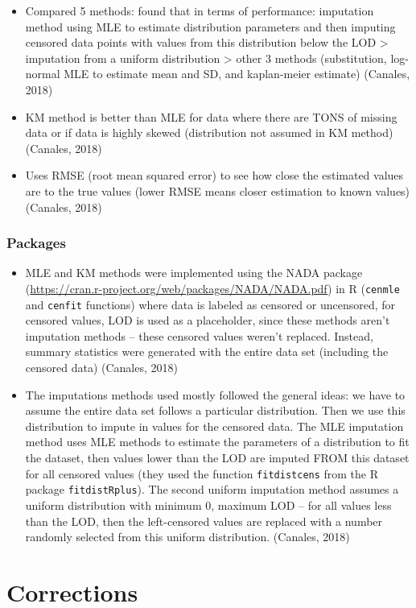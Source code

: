 \documentclass[12pt, twoside]{amherstthesis}
\begin{document}
\begin{itemize}
\item
  Compared 5 methods: found that in terms of performance: imputation method using MLE to estimate distribution parameters and then imputing censored data points with values from this distribution below the LOD \textgreater{} imputation from a uniform distribution \textgreater{} other 3 methods (substitution, log-normal MLE to estimate mean and SD, and kaplan-meier estimate) (Canales, 2018)
\item
  KM method is better than MLE for data where there are TONS of missing data or if data is highly skewed (distribution not assumed in KM method) (Canales, 2018)
\item
  Uses RMSE (root mean squared error) to see how close the estimated values are to the true values (lower RMSE means closer estimation to known values) (Canales, 2018)
\end{itemize}
\hypertarget{packages}{%
\subsection{Packages}\label{packages}}
\begin{itemize}
\item
  MLE and KM methods were implemented using the NADA package (\url{https://cran.r-project.org/web/packages/NADA/NADA.pdf}) in R (\texttt{cenmle} and \texttt{cenfit} functions) where data is labeled as censored or uncensored, for censored values, LOD is used as a placeholder, since these methods aren't imputation methods -- these censored values weren't replaced. Instead, summary statistics were generated with the entire data set (including the censored data) (Canales, 2018)
\item
  The imputations methods used mostly followed the general ideas: we have to assume the entire data set follows a particular distribution. Then we use this distribution to impute in values for the censored data. The MLE imputation method uses MLE methods to estimate the parameters of a distribution to fit the dataset, then values lower than the LOD are imputed FROM this dataset for all censored values (they used the function \texttt{fitdistcens} from the R package \texttt{fitdistRplus}). The second uniform imputation method assumes a uniform distribution with minimum 0, maximum LOD -- for all values less than the LOD, then the left-censored values are replaced with a number randomly selected from this uniform distribution. (Canales, 2018)
\end{itemize}
\hypertarget{corrections}{%
\chapter*{Corrections}\label{corrections}}
\end{document}
